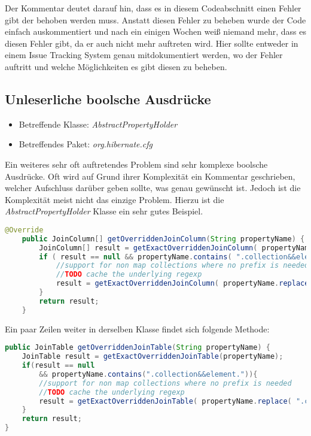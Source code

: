 Der Kommentar deutet darauf hin, dass es in diesem Codeabschnitt einen Fehler gibt der behoben werden muss. Anstatt diesen Fehler zu beheben wurde der Code einfach auskommentiert und nach ein einigen Wochen weiß niemand mehr, dass es diesen Fehler gibt, da er auch nicht mehr auftreten wird. Hier sollte entweder in einem Issue Tracking System genau mitdokumentiert werden, wo der Fehler auftritt und welche Möglichkeiten es gibt diesen zu beheben. 
 
\subsection{Unleserliche boolsche Ausdrücke}
\label{cha:BadBoolStatements}
\begin{itemize}
	\item Betreffende Klasse: \textit{AbstractPropertyHolder}
	\item Betreffendes Paket: \textit{org.hibernate.cfg}
\end{itemize}

\SuperPar Ein weiteres sehr oft auftretendes Problem sind sehr komplexe boolsche Ausdrücke. Oft wird auf Grund ihrer Komplexität ein Kommentar geschrieben, welcher Aufschluss darüber geben sollte, was genau gewünscht ist. Jedoch ist die Komplexität meist nicht das einzige Problem. Hierzu ist die \textit{AbstractPropertyHolder} Klasse ein sehr gutes Beispiel.

\begin{lstlisting}[language=Java, caption=Komplexe boolsche Ausdrücke 1 Zeile 255 - 264, label=lst:GetByPredicate]
	@Override
	public JoinColumn[] getOverriddenJoinColumn(String propertyName) {
		JoinColumn[] result = getExactOverriddenJoinColumn( propertyName );
		if ( result == null && propertyName.contains( ".collection&&element." ) ) {
			//support for non map collections where no prefix is needed
			//TODO cache the underlying regexp
			result = getExactOverriddenJoinColumn( propertyName.replace( ".collection&&element.", "."  ) );
		}
		return result;
	}
\end{lstlisting}

Ein paar Zeilen weiter in derselben Klasse findet sich folgende Methode:

\begin{lstlisting}[language=Java, caption=Komplexe boolsche Ausdrücke 2 Zeile 305 - 313, label=lst:GetByPredicate]
public JoinTable getOverriddenJoinTable(String propertyName) {
	JoinTable result = getExactOverriddenJoinTable(propertyName);
	if(result == null 
		&& propertyName.contains(".collection&&element.")){
		//support for non map collections where no prefix is needed
		//TODO cache the underlying regexp
		result = getExactOverriddenJoinTable( propertyName.replace( ".collection&&element.", "."  ) );
	}
	return result;
}
\end{lstlisting}

